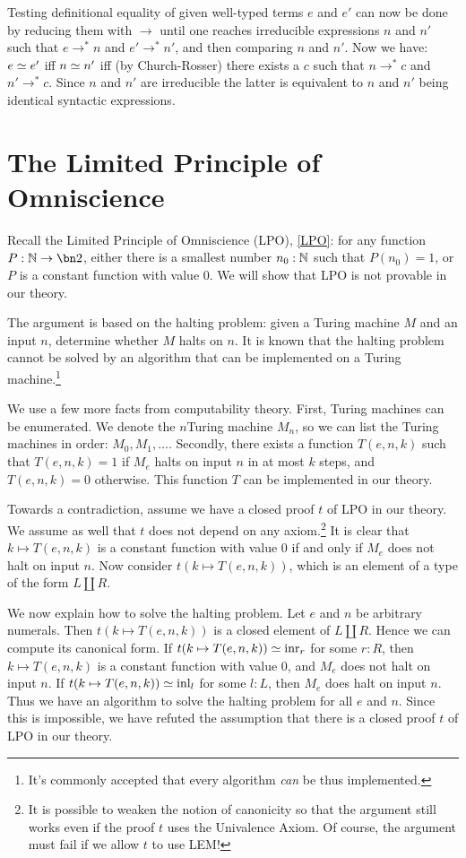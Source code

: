 Testing definitional equality of given well-typed terms $e$ and $e'$ can now be done
by reducing them with $\to$ until one reaches irreducible expressions $n$ and $n'$
such that $e\to^* n$ and $e'\to^* n'$, and then comparing $n$ and $n'$. 
Now we have: $e\jdeq e'$ iff $n\jdeq n'$ iff (by Church-Rosser)
there exists a $c$ such that $n\to^* c$ and $n'\to^* c$.
Since $n$ and $n'$ are irreducible the latter is equivalent to
$n$ and $n'$ being identical syntactic expressions.

\section{The Limited Principle of Omniscience}
\label{sec:LPO}

\begin{remark}\label{rem:LPO-solves-halting problem}
Recall the Limited Principle of Omniscience (LPO), \cref{LPO}:
  for any function $P:\NN\to\bn 2$,
  either there is a smallest number $n_0:\mathbb{N}$ such that $P(n_0)=1$,
  or $P$ is a constant function with value $0$.
We will show that LPO is not provable in our theory.

The argument is based on the halting problem: given a Turing machine
$M$ and an input $n$, determine whether $M$ halts on $n$.
It is known that the halting problem cannot be solved by an algorithm
that can be implemented on a Turing machine.\footnote{It's commonly accepted that
  every algorithm \emph{can} be thus implemented.}

We use a few more facts from computability theory.
First, Turing machines can be enumerated. We denote the $n$\th Turing machine $M_n$,
so we can list the Turing machines in order: $M_0,M_1,\ldots$.
Secondly, there exists a function $T(e,n,k)$ such that $T(e,n,k) = 1$
if $M_e$ halts on input $n$ in at most $k$ steps, and $T(e,n,k) = 0$
otherwise. This function $T$ can be implemented in our theory.

Towards a contradiction, assume we have a closed proof $t$ of LPO in our theory.
We assume as well that $t$ does not depend on any axiom.\footnote{It is possible to weaken the notion
  of canonicity so that the argument still works even if the proof $t$ uses the Univalence Axiom.
Of course, the argument must fail if we allow $t$ to use LEM!}
It is clear that $k\mapsto T(e,n,k)$ is a constant function with value $0$
if and only if $M_e$ does not halt on input $n$. Now consider $t(k\mapsto T(e,n,k))$,
which is an element of a type of the form $L\coprod R$.

We now explain how to solve the halting problem.
Let $e$ and $n$ be arbitrary numerals.
Then $t(k\mapsto T(e,n,k))$ is a closed element of $L\coprod R$.
Hence we can compute its canonical form. If $t(k\mapsto T(e,n,k))\jdeq\inr{r}$ for some
$r:R$, then $k\mapsto T(e,n,k)$ is a constant function with value $0$,
and $M_e$ does not halt on input $n$. If $t(k\mapsto T(e,n,k))\jdeq\inl{l}$ for some
$l:L$, then $M_e$ does halt on input $n$.
Thus we have an algorithm to solve the halting problem
for all $e$ and $n$. Since this is impossible, we have refuted the assumption
that there is a closed proof $t$ of LPO in our theory.
\end{remark}

